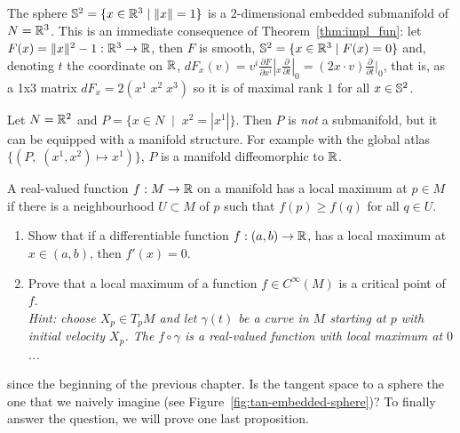 \begin{example}\label{ex:s2}
  The sphere $\mathbb{S}^2 = \{x\in\mathbb{R}^3 \mid \|x\| = 1\}$ is a $2$-dimensional embedded submanifold of $N=\mathbb{R}^3$.
  This is an immediate consequence of Theorem~\ref{thm:impl_fun}: let $F(x) = \|x\|^2 -1 : \mathbb{R}^3 \to \mathbb{R}$, then $F$ is smooth, $\mathbb{S}^2 = \{x\in\mathbb{R}^3\mid F(x)=0\}$ and, denoting $t$ the coordinate on $\mathbb{R}$, $dF_x(v)= v^i \frac{\partial F}{\partial x^i}|_x \frac{\partial}{\partial t}|_0 = (2x\cdot v) \frac{\partial}{\partial t}|_0$, that is, as a 1x3 matrix $dF_x = 2(x^1\; x^2\; x^3)$ so it is of maximal rank $1$ for all $x\in\mathbb{S}^2$.
\end{example}

\begin{example}
  Let $N = \mathbb{R}^2$ and $P = \{ x\in N \;\mid\; x^2 = |x^1| \}$.
  Then $P$ is \emph{not} a submanifold, but it can be equipped with a manifold structure.
  For example with the global atlas $\{(P,\; (x^1,x^2)\mapsto x^1)\}$, $P$ is a manifold diffeomorphic to $\mathbb{R}$.
\end{example}

\begin{exercise}
  A real-valued function $f:M\to\mathbb{R}$ on a manifold has a local maximum at $p\in M$ if there is a neighbourhood $U\subset M$ of $p$ such that $f(p) \geq f(q)$ for all $q\in U$.
  \begin{enumerate}
    \item Show that if a differentiable function $f:(a,b)\to\mathbb{R}$, has a local maximum at $x\in (a,b)$, then $f'(x) = 0$.
    \item Prove that a local maximum of a function $f\in C^\infty(M)$ is a critical point of $f$.\\
          \textit{\small Hint: choose $X_p\in T_pM$ and let $\gamma(t)$ be a curve in $M$ starting at $p$ with initial velocity $X_p$. The $f\circ \gamma$ is a real-valued function with local maximum at $0$...}
  \end{enumerate}
\end{exercise}

 since the beginning of the previous chapter.
Is the tangent space to a sphere the one that we naively imagine (see Figure~\ref{fig:tan-embedded-sphere})?
To finally answer the question, we will prove one last proposition.

